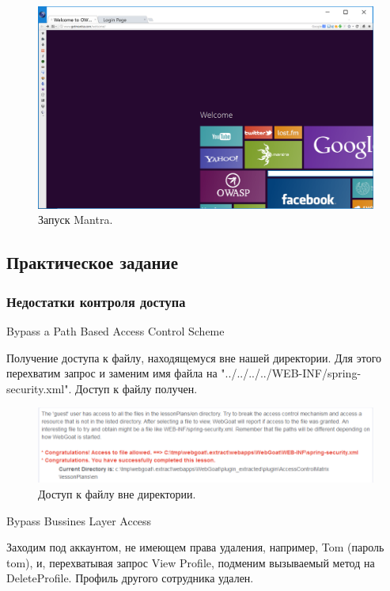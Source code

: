 \documentclass[10pt,a4paper]{article}
\begin{document}
\begin{figure}[H]
\centering
\includegraphics[width=\textwidth]{mantra_started}
\caption{Запуск Mantra.}
\end{figure}


\subsection{Практическое задание}

\subsubsection{Недостатки контроля доступа}

Bypass a Path Based Access Control Scheme

Получение доступа к файлу, находящемуся вне нашей директории. Для этого перехватим запрос и заменим имя файла на "../../../../WEB-INF/spring-security.xml". Доступ к файлу получен.

\begin{figure}[h]
\centering
\includegraphics[width=\textwidth]{access_spring_security}
\caption{Доступ к файлу вне директории.}
\end{figure}

Bypass Bussines Layer Access

Заходим под аккаунтом, не имеющем права удаления, например, Tom (пароль tom), и, перехватывая запрос View Profile, подменим вызываемый метод на DeleteProfile. Профиль другого сотрудника удален. 
\end{document}
